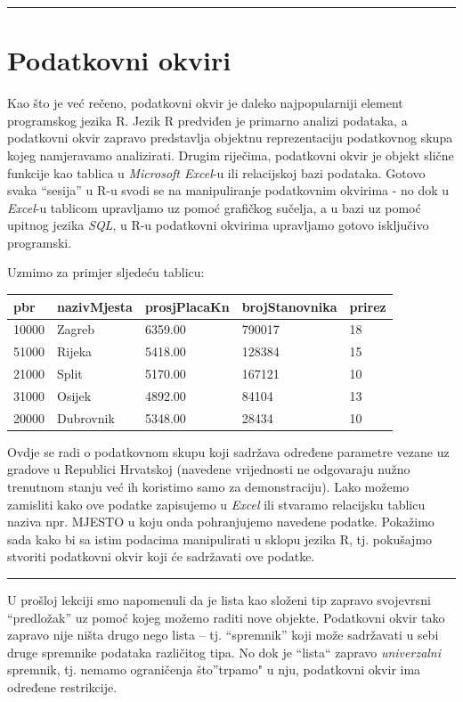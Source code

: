 \documentclass[]{book}
\theoremstyle{definition}
\theoremstyle{definition}
\theoremstyle{definition}
\theoremstyle{remark}
\begin{document}
\begin{center}\rule{0.5\linewidth}{\linethickness}\end{center}

\section{Podatkovni okviri}\label{podatkovni-okviri}

Kao što je već rečeno, podatkovni okvir je daleko najpopularniji element
programskog jezika R. Jezik R predviđen je primarno analizi podataka, a
podatkovni okvir zapravo predstavlja objektnu reprezentaciju podatkovnog
skupa kojeg namjeravamo analizirati. Drugim riječima, podatkovni okvir
je objekt slične funkcije kao tablica u \emph{Microsoft Excel}-u ili
relacijskoj bazi podataka. Gotovo svaka ``sesija'' u R-u svodi se na
manipuliranje podatkovnim okvirima - no dok u \emph{Excel}-u tablicom
upravljamo uz pomoć grafičkog sučelja, a u bazi uz pomoć upitnog jezika
\emph{SQL}, u R-u podatkovni okvirima upravljamo gotovo isključivo
programski.

Uzmimo za primjer sljedeću tablicu:

\begin{longtable}[]{@{}lllll@{}}
\toprule
pbr & nazivMjesta & prosjPlacaKn & brojStanovnika &
prirez\tabularnewline
\midrule
\endhead
10000 & Zagreb & 6359.00 & 790017 & 18\tabularnewline
51000 & Rijeka & 5418.00 & 128384 & 15\tabularnewline
21000 & Split & 5170.00 & 167121 & 10\tabularnewline
31000 & Osijek & 4892.00 & 84104 & 13\tabularnewline
20000 & Dubrovnik & 5348.00 & 28434 & 10\tabularnewline
\bottomrule
\end{longtable}

Ovdje se radi o podatkovnom skupu koji sadržava određene parametre
vezane uz gradove u Republici Hrvatskoj (navedene vrijednosti ne
odgovaraju nužno trenutnom stanju već ih koristimo samo za
demonstraciju). Lako možemo zamisliti kako ove podatke zapisujemo u
\emph{Excel} ili stvaramo relacijsku tablicu naziva npr. MJESTO u koju
onda pohranjujemo navedene podatke. Pokažimo sada kako bi sa istim
podacima manipulirati u sklopu jezika R, tj. pokušajmo stvoriti
podatkovni okvir koji će sadržavati ove podatke.

\begin{center}\rule{0.5\linewidth}{\linethickness}\end{center}

U prošloj lekciji smo napomenuli da je lista kao složeni tip zapravo
svojevrsni ``predložak'' uz pomoć kojeg možemo raditi nove objekte.
Podatkovni okvir tako zapravo nije ništa drugo nego lista -- tj.
``spremnik'' koji može sadržavati u sebi druge spremnike podataka
različitog tipa. No dok je ``lista`` zapravo \emph{univerzalni}
spremnik, tj. nemamo ograničenja što''trpamo" u nju, podatkovni okvir
ima određene restrikcije.
\end{document}
